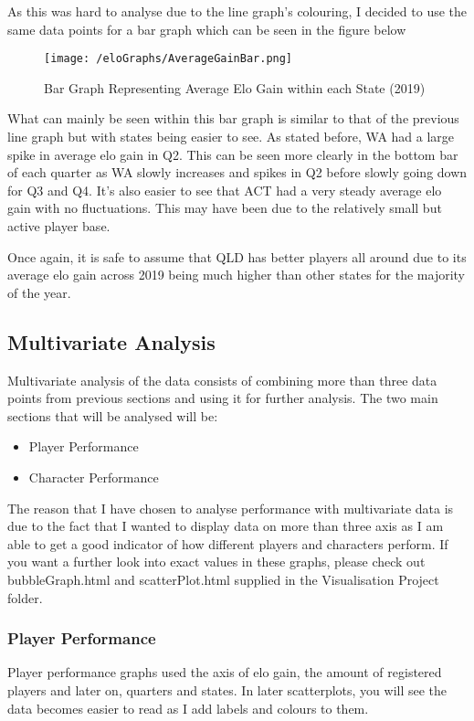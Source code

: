 \documentclass[11pt, oneside, a4paper]{article}
\begin{document}
As this was hard to analyse due to the line graph's colouring, I decided to use the same data points for a bar graph which can be seen in the figure below

\newpage
\begin{figure}[!ht]
	\centerline{\texttt{[image: /eloGraphs/AverageGainBar.png]}}
	\caption{Bar Graph Representing Average Elo Gain within each State  (2019)}
	\label{fig:figure2}
\end{figure}

What can mainly be seen within this bar graph is similar to that of the previous line graph but with states being easier to see. As stated before, WA had a large spike in average elo gain in Q2. This can be seen more clearly in the bottom bar of each quarter as WA slowly increases and spikes in Q2 before slowly going down for Q3 and Q4. It's also easier to see that ACT had a very steady average elo gain with no fluctuations. This may have been due to the relatively small but active player base. 

Once again, it is safe to assume that QLD has better players all around due to its average elo gain across 2019 being much higher than other states for the majority of the year.

\newpage
\subsection{Multivariate Analysis}
Multivariate analysis of the data consists of combining more than three data points from previous sections and using it for further analysis. The two main sections that will be analysed will be:

\begin{itemize}
	\item Player Performance
	\item Character Performance
\end{itemize}

The reason that I have chosen to analyse performance with multivariate data is due to the fact that I wanted to display data on more than three axis as I am able to get a good indicator of how different players and characters perform. If you want a further look into exact values in these graphs, please check out bubbleGraph.html and scatterPlot.html supplied in the Visualisation Project folder.

\subsubsection{Player Performance}
Player performance graphs used the axis of elo gain, the amount of registered players and later on, quarters and states. In later scatterplots, you will see the data becomes easier to read as I add labels and colours to them.
\end{document}
